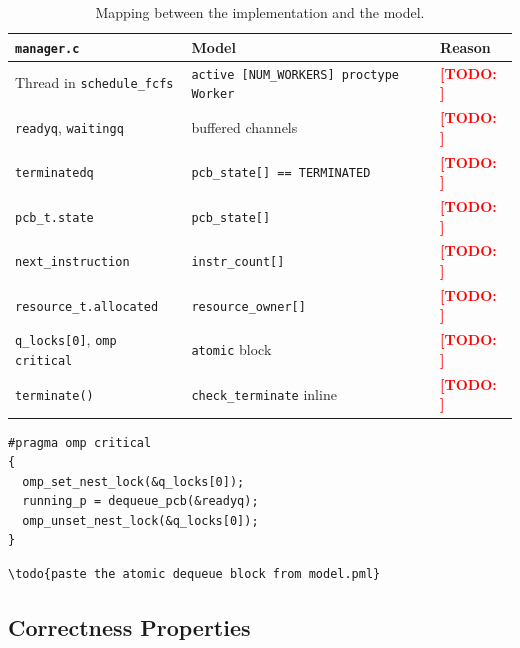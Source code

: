 \documentclass[11pt,a4paper]{article}
\newcommand{\code}[1]{\texttt{#1}}
\newcommand{\todo}[1]{\textcolor{red}{\textbf{[TODO: #1]}}}
\begin{document}
\begin{table}[htbp]
\centering
\caption{Mapping between the implementation and the model.}
\label{tab:mapping}
\begin{tabular}{p{4cm} p{4cm} p{6cm}}
\toprule
\textbf{\code{manager.c}} & \textbf{Model} & \textbf{Reason} \\
\midrule
Thread in \code{schedule\_fcfs} & \code{active [NUM\_WORKERS] proctype Worker} & \todo{} \\
\code{readyq}, \code{waitingq} & buffered channels & \todo{} \\
\code{terminatedq} & \code{pcb\_state[] == TERMINATED} & \todo{} \\
\code{pcb\_t.state} & \code{pcb\_state[]} & \todo{} \\
\code{next\_instruction} & \code{instr\_count[]} & \todo{} \\
\code{resource\_t.allocated} & \code{resource\_owner[]} & \todo{} \\
\code{q\_locks[0]}, \code{omp critical} & \code{atomic} block & \todo{} \\
\code{terminate()} & \code{check\_terminate} inline & \todo{} \\
\bottomrule
\end{tabular}
\end{table}


\begin{lstlisting}[style=clang,caption={Dequeue in \code{schedule\_fcfs}}]
#pragma omp critical
{
  omp_set_nest_lock(&q_locks[0]);
  running_p = dequeue_pcb(&readyq);
  omp_unset_nest_lock(&q_locks[0]);
}
\end{lstlisting}

\begin{lstlisting}[style=promela,caption={The same step in the model}]
\todo{paste the atomic dequeue block from model.pml}
\end{lstlisting}

\subsection{Correctness Properties}

\end{document}
